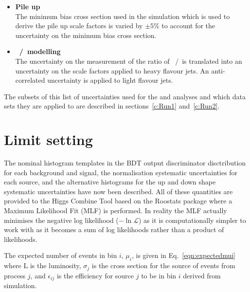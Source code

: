 \begin{itemize}
\item \textbf{Pile up}\\
The minimum bias cross section used in the simulation which is used to derive the pile up scale factors is varied by $\pm 5\%$ to account for the uncertainty on the minimum bias cross section. 

\item \textbf{\heavyflavourone~/~\heavyflavourtwo modelling}\\
The uncertainty on the measurement of the ratio of \heavyflavourone~/~\heavyflavourtwo is translated into an uncertainty on the scale factors applied to heavy flavour jets. An anti-correlated uncertainty is applied to light flavour jets.

\end{itemize}

The subsets of this list of uncertainties used for the \runone and \runtwo analyses and which data sets they are applied to are described in sections~\ref{c:Run1} and~\ref{c:Run2}. 


\section{Limit setting \label{sec:limitFit}}
The nominal histogram templates in the BDT output discriminator disctribution for each background and signal, the normalisation systematic uncertainties for each source, and the alternative histograms for the up and down shape systematic uncertainties have now been described. All of these quantities are provided to the Higgs Combine Tool based on the Roostats package where a Maximum Likelihood Fit (MLF) is performed. In reality the MLF actually minimises the negative log likelihood ($-\ln\mathcal{L}$) as it is computationally simpler to work with as it becomes a sum of log likelihoods rather than a product of likelihoods.

The expected number of events in bin $i$, $\mu_{i}$, is given in Eq.~\ref{eqn:expectedmui} where L is the luminosity, $\sigma_{j}$ is the cross section for the source of events from process $j$, and $\epsilon_{ij}$ is the efficiency for source $j$ to be in bin $i$ derived from simulation.

